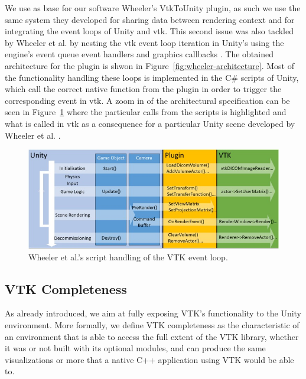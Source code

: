 We use as base for our software Wheeler's VtkToUnity plugin, as such we use the same system they developed for sharing data between rendering context and for integrating the event loops of Unity and \acrshort{vtk}. This second issue was also tackled by Wheeler et al. by nesting the \acrshort{vtk} event loop iteration in Unity's using the engine's event queue event handlers and graphics callbacks \cite{wheeler_virtual_2018}. The obtained architecture for the plugin is shwon in Figure~\ref{fig:wheeler-architecture}. Most of the functionality handling these loops is implemented in the C\# scripts of Unity, which call the correct native function from the plugin in order to trigger the corresponding event in \acrshort{vtk}. A zoom in of the architectural specification can be seen in Figure~\ref{fig:wheeler-architecture-zoomin} where the particular calls from the scripts is highlighted and what is called in \acrshort{vtk} as a consequence for a particular Unity scene developed by Wheeler et al. \cite{wheeler_virtual_2018}.

\begin{figure}[t]
    \centering
    \includegraphics[width=\textwidth]{pictures/wheeler_architecture_zoomin.jpg}
    \caption{Wheeler et al.'s script handling of the VTK event loop.}
    \label{fig:wheeler-architecture-zoomin}
\end{figure}

\subsection{VTK Completeness}

As already introduced, we aim at fully exposing VTK's functionality to the Unity environment. More formally, we define VTK completeness as the characteristic of an environment that is able to access the full extent of the VTK library, whether it was or not built with its optional modules, and can produce the same visualizations or more that a native C++ application using VTK would be able to. 


